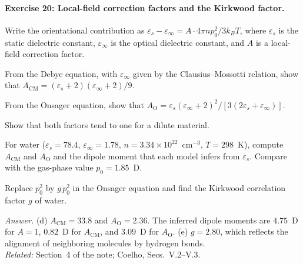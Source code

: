 \documentclass[11pt]{article}      %
\numberwithin{equation}{section}   %
\begin{document}
\paragraph{Exercise 20: Local-field correction factors and the Kirkwood factor.}
Write the orientational contribution as $\varepsilon_s - \varepsilon_\infty = A\cdot 4\pi np_0^2/3k_BT$, where $\varepsilon_s$ is the static dielectric constant, $\varepsilon_\infty$ is the optical dielectric constant, and $A$ is a local-field correction factor.
\begin{parts}
    \item From the Debye equation, with $\varepsilon_\infty$ given by the Clausius--Mossotti relation, show that $A_{\text{CM}} = (\varepsilon_s + 2)(\varepsilon_\infty + 2)/9$.
    \item From the Onsager equation, show that $A_{\text{O}} = \varepsilon_s(\varepsilon_\infty + 2)^2/[3(2\varepsilon_s + \varepsilon_\infty)]$.
    \item Show that both factors tend to one for a dilute material.
    \item For water ($\varepsilon_s = 78.4$, $\varepsilon_\infty = 1.78$, $n = 3.34\times10^{22}$~cm$^{-3}$, $T = 298$~K), compute $A_{\text{CM}}$ and $A_{\text{O}}$ and the dipole moment that each model infers from $\varepsilon_s$. Compare with the gas-phase value $p_0 = 1.85$~D.
    \item Replace $p_0^2$ by $g\,p_0^2$ in the Onsager equation and find the Kirkwood correlation factor $g$ of water.
\end{parts}
\textit{Answer.} (d) $A_{\text{CM}} = 33.8$ and $A_{\text{O}} = 2.36$. The inferred dipole moments are $4.75$~D for $A = 1$, $0.82$~D for $A_{\text{CM}}$, and $3.09$~D for $A_{\text{O}}$. (e) $g = 2.80$, which reflects the alignment of neighboring molecules by hydrogen bonds.\\
\textit{Related:} Section~4 of the note; Coelho, Secs.~V.2--V.3.
\end{document}

